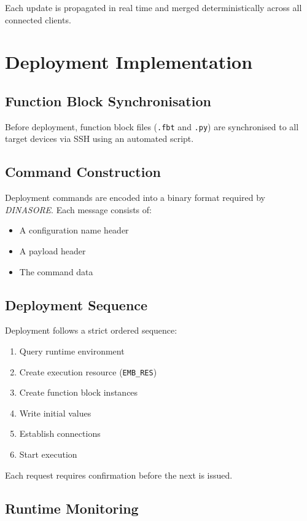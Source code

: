 Each update is propagated in real time and merged deterministically across all connected clients.

\section{Deployment Implementation}

\subsection{Function Block Synchronisation}

Before deployment, function block files (\texttt{.fbt} and \texttt{.py}) are synchronised to all target devices via SSH using an automated script.

\subsection{Command Construction}

Deployment commands are encoded into a binary format required by \textit{DINASORE}. Each message consists of:

\begin{itemize}
    \item A configuration name header
    \item A payload header
    \item The command data
\end{itemize}

\subsection{Deployment Sequence}

Deployment follows a strict ordered sequence:
\begin{enumerate}
    \item Query runtime environment
    \item Create execution resource (\texttt{EMB\_RES})
    \item Create function block instances
    \item Write initial values
    \item Establish connections
    \item Start execution
\end{enumerate}

Each request requires confirmation before the next is issued.

\subsection{Runtime Monitoring}

